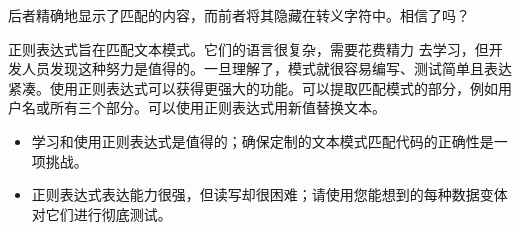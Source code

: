 后者精确地显示了匹配的内容，而前者将其隐藏在转义字符中。相信了吗？

正则表达式旨在匹配文本模式。它们的语言很复杂，需要花费精力 去学习，但开发人员发现这种努力是值得的。一旦理解了，模式就很容易编写、测试简单且表达紧凑。使用正则表达式可以获得更强大的功能。可以提取匹配模式的部分，例如用户名或所有三个部分。可以使用正则表达式用新值替换文本。


\begin{itemize}
\item
学习和使用正则表达式是值得的；确保定制的文本模式匹配代码的正确性是一项挑战。

\item
正则表达式表达能力很强，但读写却很困难；请使用您能想到的每种数据变体对它们进行彻底测试。
\end{itemize}






